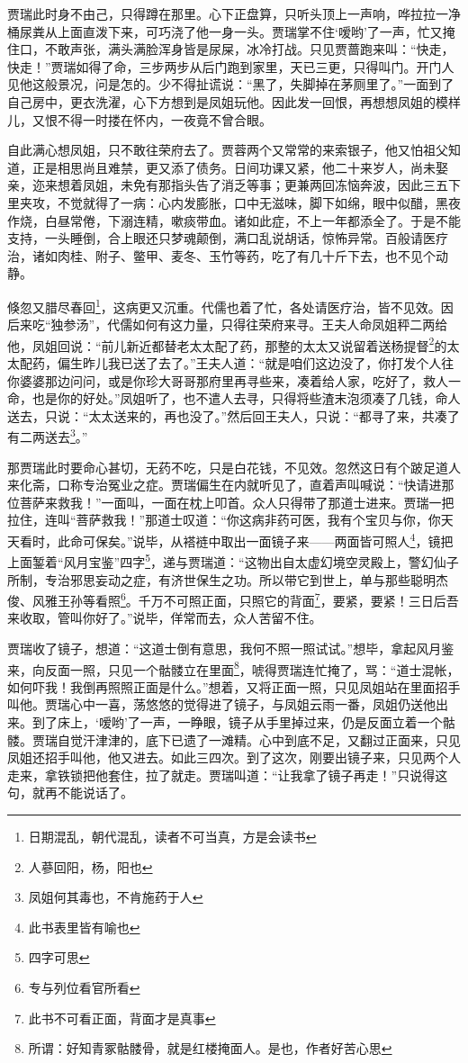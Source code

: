 \documentclass[12pt,oneside]{book}
\begin{document}
贾瑞此时身不由己，只得蹲在那里。心下正盘算，只听头顶上一声响，哗拉拉一净桶尿粪从上面直泼下来，可巧浇了他一身一头。贾瑞掌不住‘嗳哟’了一声，忙又掩住口，不敢声张，满头满脸浑身皆是尿屎，冰冷打战。只见贾蔷跑来叫：“快走，快走！”贾瑞如得了命，三步两步从后门跑到家里，天已三更，只得叫门。开门人见他这般景况，问是怎的。少不得扯谎说：“黑了，失脚掉在茅厕里了。”一面到了自己房中，更衣洗濯，心下方想到是凤姐玩他。因此发一回恨，再想想凤姐的模样儿，又恨不得一时搂在怀内，一夜竟不曾合眼。

自此满心想凤姐，只不敢往荣府去了。贾蓉两个又常常的来索银子，他又怕祖父知道，正是相思尚且难禁，更又添了债务。日间功课又紧，他二十来岁人，尚未娶亲，迩来想着凤姐，未免有那指头告了消乏等事；更兼两回冻恼奔波，因此三五下里夹攻，不觉就得了一病：心内发膨胀，口中无滋味，脚下如绵，眼中似醋，黑夜作烧，白昼常倦，下溺连精，嗽痰带血。诸如此症，不上一年都添全了。于是不能支持，一头睡倒，合上眼还只梦魂颠倒，满口乱说胡话，惊怖异常。百般请医疗治，诸如肉桂、附子、鳖甲、麦冬、玉竹等药，吃了有几十斤下去，也不见个动静。

倏忽又腊尽春回\footnote{日期混乱，朝代混乱，读者不可当真，方是会读书}，这病更又沉重。代儒也着了忙，各处请医疗治，皆不见效。因后来吃“独参汤”，代儒如何有这力量，只得往荣府来寻。王夫人命凤姐秤二两给他，凤姐回说：“前儿新近都替老太太配了药，那整的太太又说留着送杨提督\footnote{人蔘回阳，杨，阳也}的太太配药，偏生昨儿我已送了去了。”王夫人道：“就是咱们这边没了，你打发个人往你婆婆那边问问，或是你珍大哥哥那府里再寻些来，凑着给人家，吃好了，救人一命，也是你的好处。”凤姐听了，也不遣人去寻，只得将些渣末泡须凑了几钱，命人送去，只说：“太太送来的，再也没了。”然后回王夫人，只说：“都寻了来，共凑了有二两送去\footnote{凤姐何其毒也，不肯施药于人}。”

那贾瑞此时要命心甚切，无药不吃，只是白花钱，不见效。忽然这日有个跛足道人来化斋，口称专治冤业之症。贾瑞偏生在内就听见了，直着声叫喊说：“快请进那位菩萨来救我！”一面叫，一面在枕上叩首。众人只得带了那道士进来。贾瑞一把拉住，连叫“菩萨救我！”那道士叹道：“你这病非药可医，我有个宝贝与你，你天天看时，此命可保矣。”说毕，从褡裢中取出一面镜子来——两面皆可照人\footnote{此书表里皆有喻也}，镜把上面錾着“风月宝鉴”四字\footnote{四字可思}，递与贾瑞道：“这物出自太虚幻境空灵殿上，警幻仙子所制，专治邪思妄动之症，有济世保生之功。所以带它到世上，单与那些聪明杰俊、风雅王孙等看照\footnote{专与列位看官所看}。千万不可照正面，只照它的背面\footnote{此书不可看正面，背面才是真事}，要紧，要紧！三日后吾来收取，管叫你好了。”说毕，佯常而去，众人苦留不住。

贾瑞收了镜子，想道：“这道士倒有意思，我何不照一照试试。”想毕，拿起风月鉴来，向反面一照，只见一个骷髅立在里面\footnote{所谓：好知青冢骷髅骨，就是红楼掩面人。是也，作者好苦心思}，唬得贾瑞连忙掩了，骂：“道士混帐，如何吓我！我倒再照照正面是什么。”想着，又将正面一照，只见凤姐站在里面招手叫他。贾瑞心中一喜，荡悠悠的觉得进了镜子，与凤姐云雨一番，凤姐仍送他出来。到了床上，‘嗳哟’了一声，一睁眼，镜子从手里掉过来，仍是反面立着一个骷髅。贾瑞自觉汗津津的，底下已遗了一滩精。心中到底不足，又翻过正面来，只见凤姐还招手叫他，他又进去。如此三四次。到了这次，刚要出镜子来，只见两个人走来，拿铁锁把他套住，拉了就走。贾瑞叫道：“让我拿了镜子再走！”只说得这句，就再不能说话了。
\end{document}
